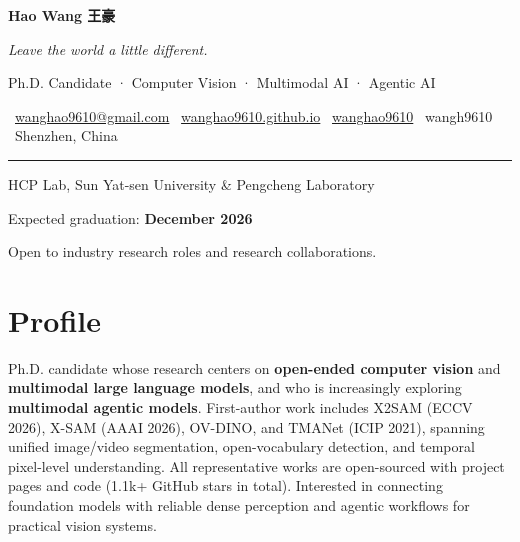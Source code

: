 \documentclass[10pt,letterpaper]{article}
\newcommand{\sep}{{\color{rule}\;\textbar\;}}
\begin{document}
\begin{minipage}{\textwidth}
  \vspace{2pt}
  \centering
  {\rmfamily\fontsize{28}{32}\selectfont\bfseries\color{ink} Hao Wang
   {\fontsize{20}{24}\selectfont\mdseries\color{muted} 王豪}}\par
  \vspace{5pt}
  {\rmfamily\itshape\large\color{muted} Leave the world a little different.}\par
  \vspace{4pt}
  {\normalsize\color{accent} Ph.D. Candidate · Computer Vision · Multimodal AI · Agentic AI}\par
  \vspace{7pt}
  {\small\color{muted}
    \faEnvelope\ \href{mailto:wanghao9610@gmail.com}{wanghao9610@gmail.com}
    \sep
    \faGlobe\ \href{https://wanghao9610.github.io/}{wanghao9610.github.io}
    \sep
    \faGithub\ \href{https://github.com/wanghao9610}{wanghao9610}
    \sep
    \faWeixin\ wangh9610
    \sep
    \faMapMarker*\ Shenzhen, China
  }\par
  \vspace{7pt}
  {\color{ink}\rule{\linewidth}{0.8pt}}\par
  \vspace{5pt}
  \begin{minipage}[t]{0.62\textwidth}
    \RaggedRight\small\color{muted} HCP Lab, Sun Yat-sen University \& Pengcheng Laboratory
  \end{minipage}%
  \hfill
  \begin{minipage}[t]{0.36\textwidth}
    \RaggedLeft\small\color{muted} Expected graduation: \textbf{\color{accent}December 2026}
  \end{minipage}\par
  \vspace{1pt}
  {\small\color{muted}\RaggedRight Open to industry research roles and research collaborations.\par}
\end{minipage}

\section{Profile}
Ph.D. candidate whose research centers on \textbf{open-ended computer vision} and \textbf{multimodal large language models}, and who is increasingly exploring \textbf{multimodal agentic models}. First-author work includes X2SAM (ECCV 2026), X-SAM (AAAI 2026), OV-DINO, and TMANet (ICIP 2021), spanning unified image/video segmentation, open-vocabulary detection, and temporal pixel-level understanding. All representative works are open-sourced with project pages and code (1.1k+ GitHub stars in total). Interested in connecting foundation models with reliable dense perception and agentic workflows for practical vision systems.
\end{document}
